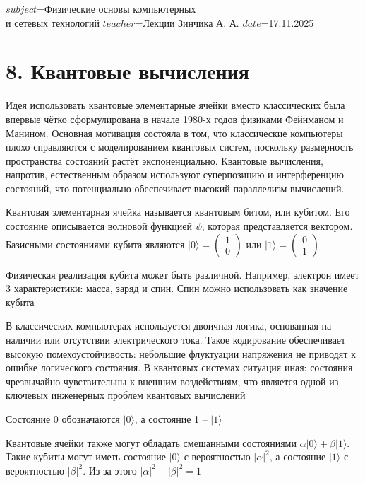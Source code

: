 $subject$=Физические основы компьютерных \\ и сетевых технологий
$teacher$=Лекции Зинчика А. А.
$date$=17.11.2025

\section{8. Квантовые вычисления}

Идея использовать квантовые элементарные ячейки вместо классических была впервые чётко сформулирована в начале 1980-х годов физиками Фейнманом и Манином. Основная мотивация состояла в том, что классические компьютеры плохо справляются с моделированием квантовых систем, поскольку размерность пространства состояний растёт экспоненциально. Квантовые вычисления, напротив, естественным образом используют суперпозицию и интерференцию состояний, что потенциально обеспечивает высокий параллелизм вычислений.

Квантовая элементарная ячейка называется квантовым битом, или кубитом. Его состояние описывается волновой функцией $\psi$, которая представляется вектором. Базисными состояниями кубита являются $|0\rangle = \begin{pmatrix}1 \\ 0\end{pmatrix}$ или $|1\rangle = \begin{pmatrix}0 \\ 1\end{pmatrix}$


Физическая реализация кубита может быть различной. Например, электрон имеет 3 характеристики: масса, заряд и спин. Спин можно использовать как значение кубита

В классических компьютерах используется двоичная логика, основанная на наличии или отсутствии электрического тока. Такое кодирование обеспечивает высокую помехоустойчивость: небольшие флуктуации напряжения не приводят к ошибке логического состояния. В квантовых системах ситуация иная: состояния чрезвычайно чувствительны к внешним воздействиям, что является одной из ключевых инженерных проблем квантовых вычислений

\mediumvspace

Состояние 0 обозначаются $|0\rangle$, а состояние 1 -- $|1\rangle$

Квантовые ячейки также могут обладать смешанными состояниями $\alpha |0\rangle + \beta |1\rangle$. Такие кубиты могут иметь состояние $|0\rangle$ с вероятностью $|\alpha|^2$, а состояние $|1\rangle$ с вероятностью $|\beta|^2$. Из-за этого $|\alpha|^2 + |\beta|^2 = 1$

